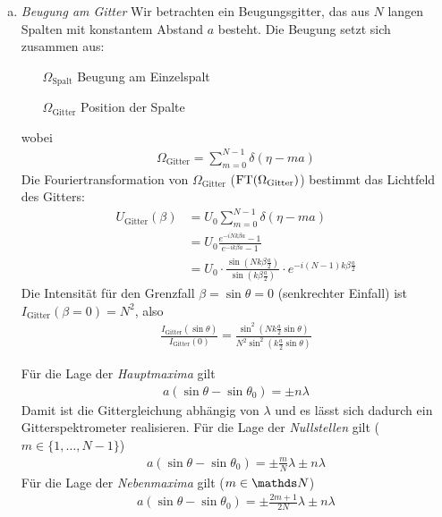 \begin{enumerate}[a)]
\item \emph{Beugung am Gitter}
Wir betrachten ein Beugungsgitter, das aus $N$ langen Spalten mit
konstantem Abstand $a$ besteht.
Die Beugung setzt sich zusammen aus:
\begin{itemize}
\item[$\Omega_\text{Spalt}$] Beugung am Einzelspalt
\item[$\Omega_\text{Gitter}$] Position der Spalte
\end{itemize}
wobei
\begin{align*}
  \Omega_\text{Gitter} = \sum_{m=0}^{N-1}\delta(\eta-ma)
\end{align*}
Die Fouriertransformation von $\Omega_\text{Gitter}$
($\operatorname{FT}(\Omega_\text{Gitter})$) bestimmt das Lichtfeld des Gitters:
\begin{align*}
  U_\text{Gitter}(\beta) 
  &= U_0 \sum_{m=0}^{N-1} \delta(\eta-ma)\\
  &= U_0 \frac
    {e^{-iNk\beta a} - 1}
    {e^{-i k\beta a} - 1} \\
  &= U_0 \cdot \frac
    { \sin\left( Nk\beta\frac{a}{2} \right) }
    { \sin\left(  k\beta\frac{a}{2} \right) }
    \cdot e^{-i(N-1)k\beta\frac{a}{2}}
\end{align*}
Die Intensität für den Grenzfall $\beta=\sin\theta=0$ (senkrechter
Einfall) ist
$I_\text{Gitter}(\beta=0) = N^2$, also
\begin{gather*}
  \frac{ I_\text{Gitter}(\sin\theta) }{ I_\text{Gitter}(0)}
  = \frac
  {    \sin^2\left( Nk\frac{a}{2} \sin\theta \right) }
  { N^2\sin^2\left(  k\frac{a}{2} \sin\theta \right) }
\end{gather*}

Für die Lage der \emph{Hauptmaxima} gilt
\begin{gather*}
  a(\sin\theta-\sin\theta_0) = \pm n\lambda
\end{gather*}
Damit ist die Gittergleichung abhängig von $\lambda$ und es lässt sich
dadurch ein Gitterspektrometer realisieren.
Für die Lage der \emph{Nullstellen} gilt ($m\in\{1,\dotsc,N-1\}$)
\begin{gather*}
  a(\sin\theta-\sin\theta_0) = \pm \frac{m}{N}\lambda \pm n\lambda
\end{gather*}
Für die Lage der \emph{Nebenmaxima} gilt ($m\in\N$)
\begin{gather*}
  a(\sin\theta-\sin\theta_0) = \pm \frac{2m+1}{2N}\lambda \pm n\lambda
\end{gather*}


\end{enumerate}

